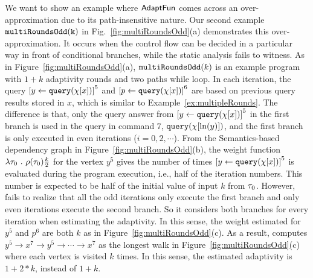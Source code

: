 We want to show an example where $\textsf{AdaptFun}$ comes across an over-approximation due to its path-insensitive nature. 
    Our second example $\mathtt{multiRoundsOdd(k)}$ in Fig.~\ref{fig:multiRoundsOdd}(a) demonstrates this over-approximation.
It occurs when the control flow can be decided in a particular way in front of conditional branches,
while the static analysis fails to witness. 
As in Figure~\ref{fig:multiRoundsOdd}(a), $\mathtt{multiRoundsOdd}(k)$
is an example program with $1 + k$ adaptivity rounds and two paths while loop.
In each iteration, the query $\clabel{\assign{y}{\query(\chi[x])}}^{5}$
and $\clabel{\assign{p}{\query(\chi[x])}}^{6}$ are based on previous query results stored in $x$,
which is similar to Example~\ref{ex:multipleRounds}.
The difference is that, only the query answer from $\clabel{\assign{y}{\query(\chi[x])}}^{5}$ in the first branch
is used in the query in command $7$, ${\tt query}(\chi[\ln(y)])$,
and the first branch is only executed in even iterations ($i = 0, 2, \cdots $).
From the Semantics-based dependency graph in Figure~\ref{fig:multiRoundsOdd}(b),
the weight function $\lambda \mathtt{\tau}_0 ~.~ \rho(\mathtt{\tau}_0) \frac{k}{2}$ for the vertex $y^5$ gives the
number of times $\clabel{\assign{y}{\query(\chi[x])}}^{5}$ is evaluated during the program execution, i.e., half of the iteration numbers.
This number is expected to be half of the initial value of input $k$ from $\mathtt{\tau}_0$.
However, {\THESYSTEM} fails to realize that all the odd iterations only execute the first branch
and only even iterations execute the second branch. 
So it considers both branches for every iteration when estimating the adaptivity. 
In this sense, the weight estimated for $y^5$ and $p^6$ are both 
$k$ as in Figure~\ref{fig:multiRoundsOdd}(c).
As a result, {\THESYSTEM} computes $y^5  \to x^7  \to y^5  \to \cdots \to x^7 $
as the longest walk in Figure~\ref{fig:multiRoundsOdd}(c)
where each vertex is visited $k$ times.
In this sense, the estimated adaptivity is $1 + 2 * k$, instead of $1 + k$. 
%
